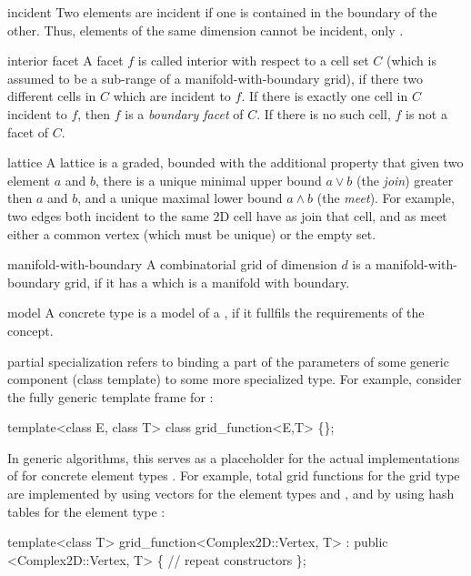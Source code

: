 \begin{Glossar}
\item[incident]
 Two elements are incident if one is contained in the boundary 
 of the other. Thus, elements of the same dimension cannot be incident,
 only .

\item[interior facet] A facet $f$ is called interior with respect to a cell set 
  $C$ (which is assumed to be a sub-range of a manifold-with-boundary grid),
  if there two different cells in $C$ which are incident to $f$.
  If there is exactly one cell in $C$ incident to $f$, then $f$ is a
  {\sl boundary facet\/} of $C$. If there is no such cell, $f$ is not a facet 
  of $C$.


\item[lattice]
  A lattice is a graded, bounded 
  with the additional property that given two element $a$ and $b$,
  there is a unique minimal upper bound $a \vee b$ (the {\sl join\/})
  greater then $a$ and $b$,
  and a unique maximal lower bound $a \wedge b$ (the {\sl meet\/}).
  For example, two edges both incident to the same 2D cell have
  as join that cell, and as meet either a common vertex (which must be unique)
  or the empty set.

\item[manifold-with-boundary]
  A combinatorial grid of dimension $d$ is a manifold-with-boundary grid,
  if it has a {\sl {}} which is a manifold with boundary.

\item[model]
  A concrete type is a model of a ,
  if it fullfils the requirements of the concept.

\item[partial specialization] refers to binding a part of the parameters 
  of some generic component (class template) to some more specialized type.
  For example, consider the fully generic template frame for 
  :
  \begin{example}
  template<class E, class T>
  class grid_function<E,T> \{\};
  \end{example}
  In generic algorithms, this serves as a placeholder for the actual implementations of 
   for concrete element  types .
  For example, total grid functions for the 
  grid type are implemented by using vectors for the element types 
  and , and by using hash tables for the element type :
  \begin{example}
  template<class T>
  grid_function<Complex2D::Vertex, T> 
    : public <Complex2D::Vertex, T> \{
    // repeat constructors
  \};


\end{example}
\end{Glossar}
